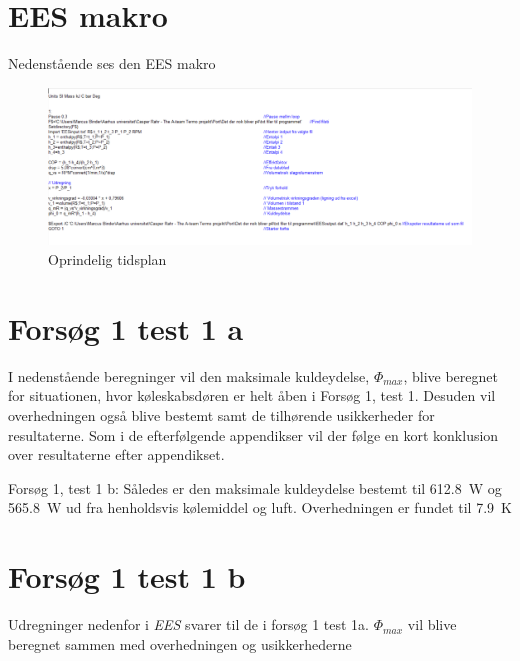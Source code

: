 \documentclass[Hovedrapport.tex]{subfiles}
\begin{document}
\section{EES makro}
\label{sec:apndx_EES_makro}
Nedenstående ses den EES makro 
\begin{figure}[H]
    \centering
    \includegraphics[width=\textwidth]{Billeder/EES_makro.png}
    \caption{Oprindelig tidsplan}
    \label{fig:apndx_EES_makro}
\end{figure}
\newpage

\section{Forsøg 1 test 1 a}
\label{sec:f1t1a}
I nedenstående beregninger vil den maksimale kuldeydelse, $\Phi_{max}$, blive beregnet for situationen, hvor køleskabsdøren er helt åben i Forsøg 1, test 1. Desuden vil overhedningen også blive bestemt samt de tilhørende usikkerheder for resultaterne. Som i de efterfølgende appendikser vil der følge en kort konklusion over resultaterne efter appendikset. 
\begin{minipage}{1.0\textwidth}

\end{minipage}

 

Forsøg 1, test 1 b: Således er den maksimale kuldeydelse bestemt til \SI{612,8}{W} og \SI{565,8}{W} ud fra henholdsvis kølemiddel og luft. Overhedningen er fundet til \SI{7,9}{K}

\newpage
\section{Forsøg 1 test 1 b}

Udregninger nedenfor i \textit{EES } svarer til de i forsøg 1 test 1a. $\Phi_{max}$ vil blive beregnet sammen med overhedningen og usikkerhederne 
\end{document}
